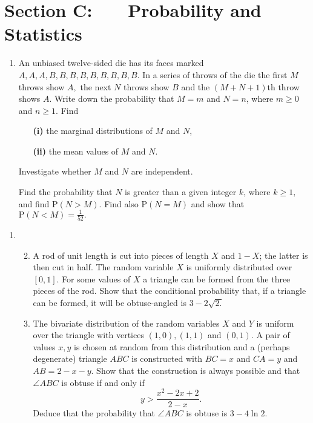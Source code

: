 \documentclass[a4, 11pt]{report}
\newlength{\qspace}
\newcounter{qnumber}
\newenvironment{question}%
 {\vspace{\qspace}
  \begin{enumerate}[\bfseries 1\quad][10]%
    \setcounter{enumi}{\value{qnumber}}%
    \item%
 }
{
  \end{enumerate}
  \filbreak
  \stepcounter{qnumber}
 }
\newenvironment{questionparts}[1][1]%
 {
  \begin{enumerate}[\bfseries (i)]%
    \setcounter{enumii}{#1}
    \addtocounter{enumii}{-1}
    \setlength{\itemsep}{5mm}
    \setlength{\parskip}{8pt}
 }
 {
  \end{enumerate}
 }
\begin{document}
	\newpage
\section*{Section C: \ \ \ Probability and Statistics}


\begin{question}
An unbiased twelve-sided die has its faces marked $A,A,A,B,B,B,B,B,B,B,B,B.$
In a series of throws of the die the first $M$ throws show $A,$
the next $N$ throws show $B$ and the $(M+N+1)$th throw shows $A$.
Write down the probability that $M=m$ and $N=n$, where $m\geqslant0$
and $n\geqslant1.$ Find

\begin{itemize}
\setlength{\itemsep}{3mm}
\item[\bf (i)]  the marginal distributions of $M$ and $N$, 
\item[\bf (ii)] the mean values of $M$ and $N$. 
\end{itemize}
Investigate whether $M$ and $N$ are independent. 


Find the probability that $N$ is greater than a given integer $k$,
where $k\geqslant1,$ and find $\mathrm{P}(N>M).$ Find also $\mathrm{P}(N=M)$
and show that $\mathrm{P}(N<M)=\frac{1}{52}.$ 
\end{question}

\begin{question}

\begin{questionparts}
\item A rod of unit length is cut into pieces of
length $X$ and $1-X$; the latter is then cut in half. The random
variable $X$ is uniformly distributed over $[0,1].$ For some values
of $X$ a triangle can be formed from the three pieces of the rod.
Show that the conditional probability that, if a triangle can be formed,
it will be obtuse-angled is $3-2\sqrt{2.}$


\item The bivariate distribution of the random variables $X$ and
$Y$ is uniform over the triangle with vertices $(1,0),(1,1)$ and
$(0,1).$ A pair of values $x,y$ is chosen at random from this distribution
and a (perhaps degenerate) triangle $ABC$ is constructed with $BC=x$
and $CA=y$ and $AB=2-x-y.$ Show that the construction is always
possible and that $\angle ABC$ is obtuse if and only if 
\[
y>\frac{x^{2}-2x+2}{2-x}.
\]
Deduce that the probability that $\angle ABC$ is obtuse is $3-4\ln2.$
\end{questionparts}

\end{question}
\end{document}
